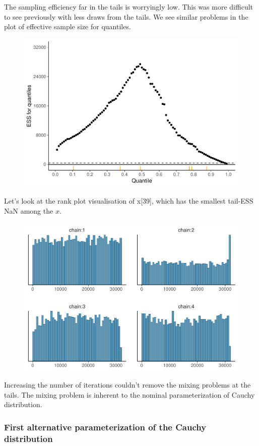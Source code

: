 \documentclass[american,]{article}
\begin{document}
The sampling efficiency far in the tails is worryingly low. This was
more difficult to see previously with less draws from the tails. We see
similar problems in the plot of effective sample size for quantiles.

\begin{figure}[tp]
  \centering
  \includegraphics[width=0.6\linewidth]{graphics/quantile-ess-fit-nom-td20l-finer-1.pdf}
\end{figure}

Let's look at the rank plot visualisation of x{[}39{]}, which has the
smallest tail-ESS NaN among the \(x\).

\begin{figure}[tp]
  \centering
  \includegraphics[width=0.6\linewidth]{graphics/hist-fit-nom-td20l-1.pdf}
\end{figure}

Increasing the number of iterations couldn't remove the mixing problems
at the tails. The mixing problem is inherent to the nominal
parameterization of Cauchy distribution.

\hypertarget{first-alternative-parameterization-of-the-cauchy-distribution}{%
\subsubsection*{First alternative parameterization of the Cauchy
distribution}\label{first-alternative-parameterization-of-the-cauchy-distribution}}
\end{document}
